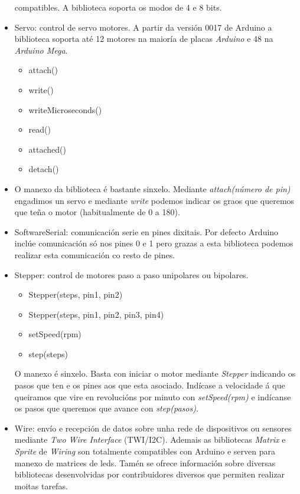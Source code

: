 \begin{itemize}
       compatibles. A biblioteca soporta os modos de 4 e 8 bits.
 \item Servo: control de servo motores. A partir da versión 0017 de Arduino a
       biblioteca soporta até 12 motores na maioría de placas \textit{Arduino}
       e 48 na \textit{Arduino Mega}.
       \begin{itemize}
        \item attach()
        \item write()
        \item writeMicroseconds()
        \item read()
        \item attached()
        \item detach()
       \end{itemize}
 \item O manexo da biblioteca é bastante sinxelo. Mediante
       \textit{attach(número de pin)} engadimos un servo e mediante
       \textit{write} podemos indicar os graos que queremos que teña o motor
       (habitualmente de 0 a 180).
 \item SoftwareSerial: comunicación serie en pines dixitais. Por defecto
       Arduino inclúe comunicación só nos pines 0 e 1 pero grazas a esta
       biblioteca podemos realizar esta comunicación co resto de pines.
 \item Stepper: control de motores paso a paso unipolares ou bipolares.
       \begin{itemize}
        \item Stepper(steps, pin1, pin2)
        \item Stepper(steps, pin1, pin2, pin3, pin4)
        \item setSpeed(rpm)
        \item step(steps)
       \end{itemize}
       O manexo é sinxelo. Basta con iniciar o motor mediante \textit{Stepper}
       indicando os pasos que ten e os pines aos que esta asociado. Indícase a
       velocidade á que queiramos que vire en revolucións por minuto con
       \textit{setSpeed(rpm)} e indícanse os pasos que queremos que avance con
       \textit{step(pasos)}.
 \item Wire: envío e recepción de datos sobre unha rede de dispositivos ou
       sensores mediante \textit{Two Wire Interface} (TWI/I2C). Ademais as
       bibliotecas \textit{Matrix} e \textit{Sprite} de \textit{Wiring} son
       totalmente compatibles con Arduino e serven para manexo de matrices de
       leds. Tamén se ofrece información sobre diversas bibliotecas
       desenvolvidas por contribuidores diversos que permiten realizar moitas
       tarefas.
\end{itemize}

